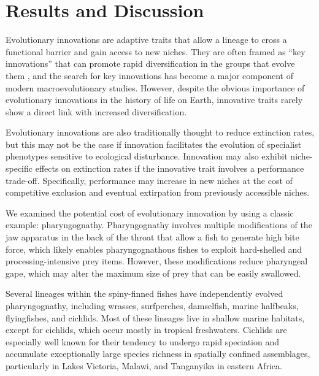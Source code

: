 \section{Results and Discussion}

Evolutionary innovations are adaptive traits that allow a lineage to cross a functional barrier and gain access to new niches. \cite{mayr1963animal} They are often framed as ``key innovations'' that can promote rapid diversification in the groups that evolve them \cite{heard1995key, hunter_key_1998}, and the search for key innovations has become a major component of modern macroevolutionary studies. \cite{maia_key_2013, rabosky_diversity-dependence_2013} However, despite the obvious importance of evolutionary innovations in the history of life on Earth, innovative traits rarely show a direct link with increased diversification. \cite{cracraft_origin_1990, vermeij_innovation_2001, vermeij_ecology_2007, vermeij_crucibles_2012, alfaro_does_2009, givnish_molecular_2000, hodges_spurring_1995, schluter2000ecology, brawand_genomic_2014, mitter_phylogenetic_1988}

Evolutionary innovations are also traditionally thought to reduce extinction rates, \cite{heard1995key} but this may not be the case if innovation facilitates the evolution of specialist phenotypes sensitive to ecological disturbance. \cite{futuyma_evolution_1988, givnish_adaptive_1998} Innovation may also exhibit niche-specific effects on extinction rates if the innovative trait involves a performance trade-off. \cite{schluter2000ecology} Specifically, performance may increase in new niches at the cost of competitive exclusion and eventual extirpation from previously accessible niches.

We examined the potential cost of evolutionary innovation by using a classic example: pharyngognathy. \cite{liem_evolutionary_1973} Pharyngognathy involves multiple modifications of the jaw apparatus in the back of the throat that allow a fish to generate high bite force, which likely enables pharyngognathous fishes to exploit hard-shelled and processing-intensive prey items. \cite{wainwright_biomechanical_1987} However, these modifications reduce pharyngeal gape, which may alter the maximum size of prey that can be easily swallowed. \cite{wainwright_evolution_2012}

Several lineages within the spiny-finned fishes have independently evolved pharyngognathy, including wrasses, surfperches, damselfish, marine halfbeaks, flyingfishes, and cichlids. \cite{wainwright_evolution_2012} Most of these lineages live in shallow marine habitats, except for cichlids, which occur mostly in tropical freshwaters. Cichlids are especially well known for their tendency to undergo rapid speciation and accumulate exceptionally large species richness in spatially confined assemblages, particularly in Lakes Victoria, Malawi, and Tanganyika in eastern Africa. \cite{greenwood1981haplochromine, seehausen2006african}

